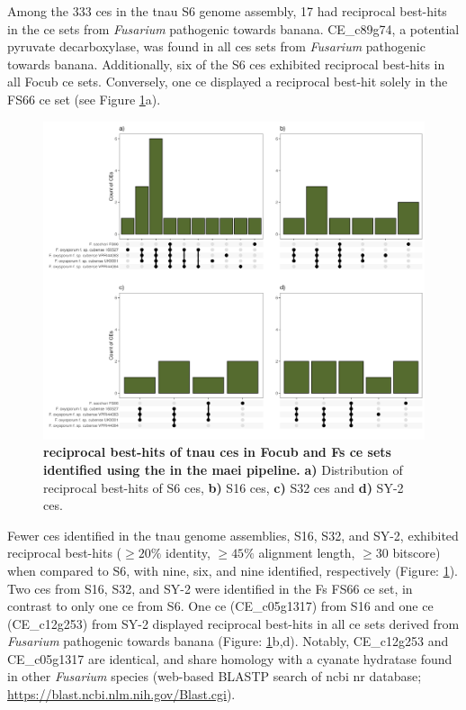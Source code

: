 Among the 333 \acp{ce} in the \ac{tnau} S6 genome assembly, 17 had reciprocal best-hits in the \ac{ce} sets from \textit{Fusarium} pathogenic towards banana. CE\_c89g74, a potential pyruvate decarboxylase, was found in all \acp{ce} sets from \textit{Fusarium}  pathogenic towards banana. Additionally, six of the S6 \acp{ce} exhibited reciprocal best-hits in all \ac{Focub} \ac{ce} sets. Conversely, one \ac{ce} displayed a reciprocal best-hit solely in the FS66 \ac{ce} set (see Figure \ref{fig:RBHupsets}a). 
 
\begin{figure}[h!]
    \centering
    \includegraphics[width=\textwidth]{Figures/UpSetPlots.png}
    \caption[Distribution of reciprocal best-hits of \ac{tnau} \acp{ce}  in \ac{Focub} and \ac{Fs} \ac{ce} sets identified using the in the \ac{maei} pipeline.]{\textbf{reciprocal best-hits of \ac{tnau} \acp{ce} in \ac{Focub} and \ac{Fs} \ac{ce} sets identified using the in the \ac{maei} pipeline.} \textbf{a)} Distribution of reciprocal best-hits of S6 \acp{ce}, \textbf{b)} S16 \acp{ce}, \textbf{c)} S32 \acp{ce} and \textbf{d)} SY-2 \acp{ce}.}
    \label{fig:RBHupsets}
\end{figure}

Fewer \acp{ce} identified in the \ac{tnau} genome assemblies, S16, S32, and SY-2, exhibited reciprocal best-hits ($\geq20\%$ identity, $\geq45\%$ alignment length, $\geq30$ bitscore) when compared to S6, with nine, six, and nine identified, respectively (Figure: \ref{fig:RBHupsets}). Two \acp{ce} from S16, S32, and SY-2 were identified in the \ac{Fs} FS66 \ac{ce} set, in contrast to only one \ac{ce} from S6. One \ac{ce} (CE\_c05g1317) from S16 and one \ac{ce} (CE\_c12g253) from SY-2 displayed reciprocal best-hits in all \ac{ce} sets derived from \textit{Fusarium} pathogenic towards banana (Figure: \ref{fig:RBHupsets}b,d). Notably, CE\_c12g253 and CE\_c05g1317 are identical, and share homology with a cyanate hydratase found in other \textit{Fusarium} species (web-based BLASTP search of \ac{ncbi} nr database; \href{https://blast.ncbi.nlm.nih.gov/Blast.cgi}{https://blast.ncbi.nlm.nih.gov/Bla\-st.cgi}).

